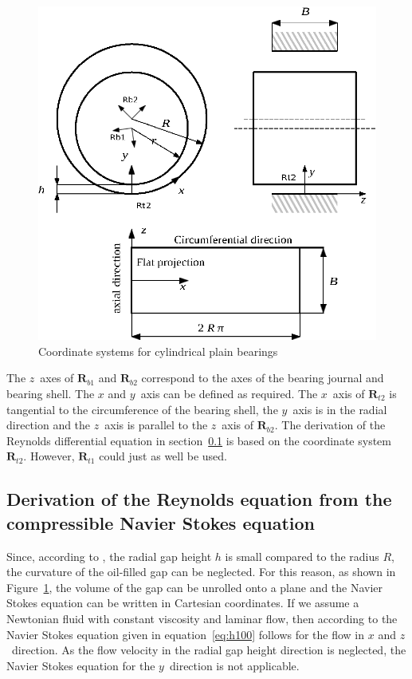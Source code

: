 \begin{figure}[htb]
\centering
\includegraphics[width=0.5\linewidth]{fig_h100en}
\caption{Coordinate systems for cylindrical plain bearings}
\label{fig:h100}
\end{figure}

The $z$~axes of $\boldsymbol{R}_{b1}$ and $\boldsymbol{R}_{b2}$ correspond to the axes of the bearing journal and bearing shell. The $x$ and $y$~axis can be defined as required. The $x$~axis of $\boldsymbol{R}_{t2}$ is tangential to the circumference of the bearing shell, the $y$~axis is in the radial direction and the $z$~axis is parallel to the $z$~axis of $\boldsymbol{R}_{b2}$. The derivation of the Reynolds differential equation in section~\ref{sec:navier_stokes} is based on the coordinate system~$\boldsymbol{R}_{t2}$. However, $\boldsymbol{R}_{t1}$ could just as well be used.

\subsection{Derivation of the Reynolds equation from the compressible Navier Stokes equation}
\label{sec:navier_stokes}
Since, according to \cite{Butenschoen-1976}, the radial gap height $h$ is small compared to the radius $R$, the curvature of the oil-filled gap can be neglected. For this reason, as shown in Figure~\ref{fig:h100}, the volume of the gap can be unrolled onto a plane and the Navier Stokes equation can be written in Cartesian coordinates. If we assume a Newtonian fluid with constant viscosity and laminar flow, then according to \cite{DIRKBARTEL2010} the Navier Stokes equation given in equation~\ref{eq:h100} follows for the flow in $x$ and $z$~direction. As the flow velocity in the radial gap height direction is neglected, the Navier Stokes equation for the $y$~direction is not applicable.

